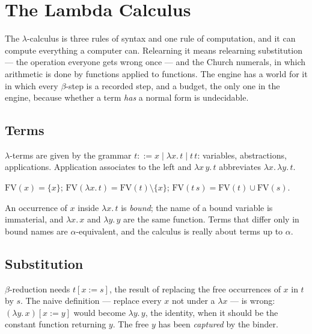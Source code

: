 \chapter{The Lambda Calculus}\label{ch:lambda}

The $\lambda$-calculus is three rules of syntax and one rule of computation, and it can compute
everything a computer can. Relearning it means relearning substitution --- the operation everyone
gets wrong once --- and the Church numerals, in which arithmetic is done by functions applied to
functions. The engine has a world for it in which every $\beta$-step is a recorded step, and a
budget, the only one in the engine, because whether a term \emph{has} a normal form is
undecidable.

\section{Terms}

\begin{definition}
  $\lambda$-terms are given by the grammar $t ::= x \mid \lambda x.\, t \mid t\, t$: variables,
  abstractions, applications. Application associates to the left and $\lambda x\, y.\, t$
  abbreviates $\lambda x.\, \lambda y.\, t$.
\end{definition}

\begin{definition}
  $\mathrm{FV}(x) = \{x\}$; $\mathrm{FV}(\lambda x.\, t) = \mathrm{FV}(t) \setminus \{x\}$;
  $\mathrm{FV}(t\, s) = \mathrm{FV}(t) \cup \mathrm{FV}(s)$.
\end{definition}

An occurrence of $x$ inside $\lambda x.\, t$ is \emph{bound}; the name of a bound variable is
immaterial, and $\lambda x.\, x$ and $\lambda y.\, y$ are the same function. Terms that differ
only in bound names are $\alpha$-equivalent, and the calculus is really about terms up to $\alpha$.

\section{Substitution}

$\beta$-reduction needs $t[x := s]$, the result of replacing the free occurrences of $x$ in $t$
by $s$. The naive definition --- replace every $x$ not under a $\lambda x$ --- is wrong:
$(\lambda y.\, x)[x := y]$ would become $\lambda y.\, y$, the identity, when it should be the
constant function returning $y$. The free $y$ has been \emph{captured} by the binder.

